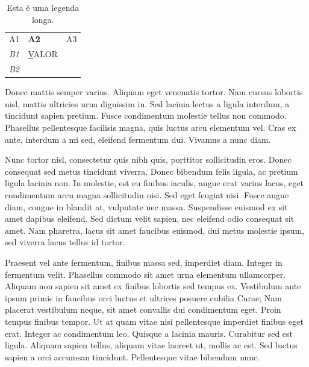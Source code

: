\documentclass{article}
\begin{document}
	\begin{table}[h]
		\centering
		\caption[Leganda Curta]{Esta é uma legenda longa.}
		\label{tab:tabela_1}
		\begin{tabular}{|l|l|l|}
			\hline
			A1          & \textbf{A2} & \multicolumn{1}{r|}{A3}  \\ \cline{1-1} \cline{3-3} 
			\textit{B1} & {\ul VALOR} & \cellcolor[HTML]{FD6864} \\ \hline
			\textit{B2} &             &                          \\ \hline
		\end{tabular}
	\end{table}
	
	Donec mattis semper varius. Aliquam eget venenatis tortor. Nam cursus lobortis nisl, mattis ultricies urna dignissim in. Sed lacinia lectus a ligula interdum, a tincidunt sapien pretium. Fusce condimentum molestie tellus non commodo. Phasellus pellentesque facilisis magna, quis luctus arcu elementum vel. Cras ex ante, interdum a mi sed, eleifend fermentum dui. Vivamus a nunc diam.
	
	Nunc tortor nisl, consectetur quis nibh quis, porttitor sollicitudin eros. Donec consequat sed metus tincidunt viverra. Donec bibendum felis ligula, ac pretium ligula lacinia non. In molestie, est eu finibus iaculis, augue erat varius lacus, eget condimentum arcu magna sollicitudin nisi. Sed eget feugiat nisi. Fusce augue diam, congue in blandit at, vulputate nec massa. Suspendisse euismod ex sit amet dapibus eleifend. Sed dictum velit sapien, nec eleifend odio consequat sit amet. Nam pharetra, lacus sit amet faucibus euismod, dui metus molestie ipsum, sed viverra lacus tellus id tortor.
	
	Praesent vel ante fermentum, finibus massa sed, imperdiet diam. Integer in fermentum velit. Phasellus commodo sit amet urna elementum ullamcorper. Aliquam non sapien sit amet ex finibus lobortis sed tempus ex. Vestibulum ante ipsum primis in faucibus orci luctus et ultrices posuere cubilia Curae; Nam placerat vestibulum neque, sit amet convallis dui condimentum eget. Proin tempus finibus tempor. Ut at quam vitae nisi pellentesque imperdiet finibus eget erat. Integer ac condimentum leo. Quisque a lacinia mauris. Curabitur sed est ligula. Aliquam sapien tellus, aliquam vitae laoreet ut, mollis ac est. Sed luctus sapien a orci accumsan tincidunt. Pellentesque vitae bibendum nunc.
	
\end{document}
